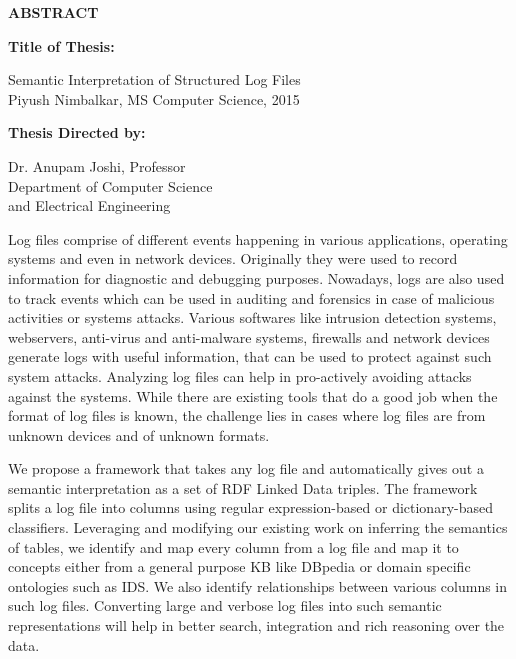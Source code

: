 \newpage
\pagestyle{empty}

\begin{center}
\large{\bf ABSTRACT} \par 
\end{center}

{\bf Title of Thesis:} \parbox[t]{4.5in}{{Semantic Interpretation of Structured Log Files\\
Piyush Nimbalkar, MS Computer Science, 2015}}
\begin{singlespace}
{\bf Thesis Directed by:}{\hspace{2.5mm}} \parbox[t]{3in}{Dr. Anupam Joshi, Professor\\
Department of Computer Science\\ 
and Electrical Engineering\\}
\end{singlespace}

Log files comprise of different events happening in various applications, operating systems and even in network devices. Originally they were used to record information for diagnostic and debugging purposes. Nowadays, logs are also used to track events which can be used in auditing and forensics in case of malicious activities or systems attacks. Various softwares like intrusion detection systems, webservers, anti-virus and anti-malware systems, firewalls and network devices generate logs with useful information, that can be used to protect against such system attacks. Analyzing log files can help in pro-actively avoiding attacks against the systems. While there are existing tools that do a good job when the format of log files is known, the challenge lies in cases where log files are from unknown devices and of unknown formats.

We propose a framework that takes any log file and automatically gives out a semantic interpretation as a set of RDF Linked Data triples. The framework splits a log file into columns using regular expression-based or dictionary-based classifiers. Leveraging and modifying our existing work on inferring the semantics of tables, we identify and map every column from a log file and map it to concepts either from a general purpose KB like DBpedia or domain specific ontologies such as IDS. We also identify relationships between various columns in such log files. Converting large and verbose log files into such semantic representations will help in better search, integration and rich reasoning over the data.

\par\vfil

